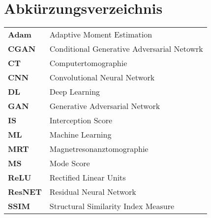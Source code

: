 
\chapter*{Abkürzungsverzeichnis}
\begin{longtable}{ll}
\textbf{Adam} & Adaptive Moment Estimation \\
\textbf{CGAN} & Conditional Generative Adversarial Netowrk \\
\textbf{CT} & Computertomographie \\
\textbf{CNN} & Convolutional Neural Network \\
\textbf{DL} & Deep Learning \\
\textbf{GAN}  & Generative Adversarial Network \\ 
\textbf{IS} & Interception Score \\
\textbf{ML} & Machine Learning\\
\textbf{MRT} & Magnetresonanztomographie \\
\textbf{MS} & Mode Score\\
\textbf{ReLU} & Rectified Linear Units\\
\textbf{ResNET} & Residual Neural Network\\
\textbf{SSIM} & Structural Similarity Index Measure\\
\end{longtable}

\cleardoublepage
